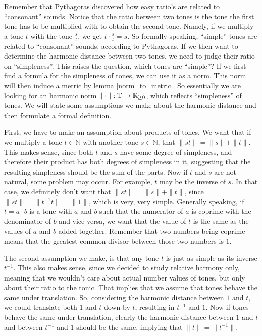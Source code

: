 \documentclass[a4paper]{book}
\theoremstyle{definition}
\begin{document}
Remember that Pythagoras discovered how easy ratio's are related to ``consonant'' sounds.
Notice that the ratio between two tones is the tone the first tone has to be multiplied with to obtain the second tone.
Namely, if we multiply a tone $t$ with the tone $\frac{s}{t}$, we get $t \cdot \frac{s}{t} = s$.
So formally speaking, ``simple'' tones are related to ``consonant'' sounds, according to Pythagoras.
If we then want to determine the harmonic distance between two tones, we need to judge their ratio on ``simpleness''.
This raises the question, which tones are ``simple''?
If we first find a formula for the simpleness of tones, we can use it as a norm.
This norm will then induce a metric by lemma \ref{norm_to_metric}.
So essentially we are looking for an harmonic norm $\| \cdot \| : \mathbb{T} \to \mathbb{R}_{\geq 0}$, which reflects ``simpleness'' of tones.
We will state some assumptions we make about the harmonic distance and then formulate a formal definition.

First, we have to make an assumption about products of tones.
We want that if we multiply a tone $t \in \mathbb{N}$ with another tone $s \in \mathbb{N}$, that $\|st\| = \|s\|+\|t\|$.
This makes sense, since both $t$ and $s$ have some degree of simpleness, and therefore their product has both degrees of simpleness in it, suggesting that the resulting simpleness should be the sum of the parts.
Now if $t$ and $s$ are not natural, some problem may occur.
For example, $t$ may be the inverse of $s$.
In that case, we definitely don't want that $\|st\| = \|s\|+\|t\|$, since $\|st\|=\|t^{-1}t\|=\|1\|$, which is very, very simple.
Generally speaking, if $t = a \cdot b$ is a tone with $a$ and $b$ such that the numerator of $a$ is coprime with the denominator of $b$ and vice versa, we want that the value of $t$ is the same as the values of $a$ and $b$ added together.
Remember that two numbers being coprime means that the greatest common divisor between those two numbers is $1$.

The second assumption we make, is that any tone $t$ is just as simple as its inverse $t^{-1}$.
This also makes sense, since we decided to study relative harmony only, meaning that we wouldn't care about actual number values of tones, but only about their ratio to the tonic. 
That implies that we assume that tones behave the same under translation.
So, considering the harmonic distance between $1$ and $t$, we could translate both $1$ and $t$ down by $t$, resulting in $t^{-1}$ and $1$.
Now if tones behave the same under translation, clearly the harmonic distance between $1$ and $t$ and between $t^{-1}$ and $1$ should be the same, implying that $\|t\| = \|t^{-1}\|$.
\end{document}
